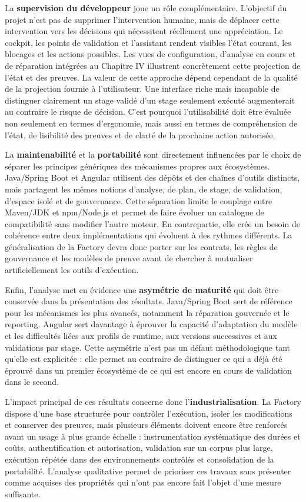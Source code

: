La \textbf{supervision du développeur} joue un rôle complémentaire. L'objectif du projet n'est pas de supprimer l'intervention humaine, mais de déplacer cette intervention vers les décisions qui nécessitent réellement une appréciation. Le cockpit, les points de validation et l'assistant rendent visibles l'état courant, les blocages et les actions possibles. Les vues de configuration, d'analyse en cours et de réparation intégrées au Chapitre IV illustrent concrètement cette projection de l'état et des preuves. La valeur de cette approche dépend cependant de la qualité de la projection fournie à l'utilisateur. Une interface riche mais incapable de distinguer clairement un stage validé d'un stage seulement exécuté augmenterait au contraire le risque de décision. C'est pourquoi l'utilisabilité doit être évaluée non seulement en termes d'ergonomie, mais aussi en termes de compréhension de l'état, de lisibilité des preuves et de clarté de la prochaine action autorisée.

La \textbf{maintenabilité} et la \textbf{portabilité} sont directement influencées par le choix de séparer les principes génériques des mécanismes propres aux écosystèmes. Java/Spring Boot et Angular utilisent des dépôts et des chaînes d'outils distincts, mais partagent les mêmes notions d'analyse, de plan, de stage, de validation, d'espace isolé et de gouvernance. Cette séparation limite le couplage entre Maven/JDK et npm/Node.js et permet de faire évoluer un catalogue de compatibilité sans modifier l'autre moteur. En contrepartie, elle crée un besoin de cohérence entre deux implémentations qui évoluent à des rythmes différents. La généralisation de la Factory devra donc porter sur les contrats, les règles de gouvernance et les modèles de preuve avant de chercher à mutualiser artificiellement les outils d'exécution.

Enfin, l'analyse met en évidence une \textbf{asymétrie de maturité} qui doit être conservée dans la présentation des résultats. Java/Spring Boot sert de référence pour les mécanismes les plus avancés, notamment la réparation gouvernée et le reporting. Angular sert davantage à éprouver la capacité d'adaptation du modèle et les difficultés liées aux profils de runtime, aux versions successives et aux validations par stage. Cette asymétrie n'est pas un défaut méthodologique tant qu'elle est explicitée : elle permet au contraire de distinguer ce qui a déjà été éprouvé dans un premier écosystème de ce qui est encore en cours de validation dans le second.

L'impact principal de ces résultats concerne donc l'\textbf{industrialisation}. La Factory dispose d'une base structurée pour contrôler l'exécution, isoler les modifications et conserver des preuves, mais plusieurs éléments doivent encore être renforcés avant un usage à plus grande échelle : instrumentation systématique des durées et coûts, authentification et autorisation, validation sur un corpus plus large, exécution répétée dans des environnements contrôlés et consolidation de la portabilité. L'analyse qualitative permet de prioriser ces travaux sans présenter comme acquises des propriétés qui n'ont pas encore fait l'objet d'une mesure suffisante.

